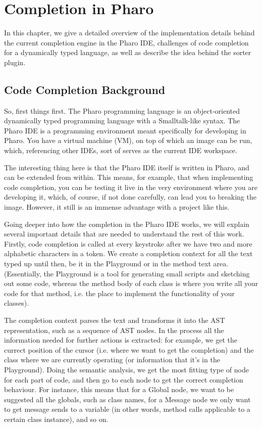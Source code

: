 \chapter{Completion in Pharo}
\label{chap:Completion in Pharo}

In this chapter, we give a detailed overview of the implementation details behind the current completion engine in the Pharo IDE, challenges of code completion for a dynamically typed language, as well as describe the idea behind the sorter plugin.

\section{Code Completion Background}
So, first things first. The Pharo programming language is an object-oriented dynamically typed programming language with a Smalltalk-like syntax. The Pharo IDE is a programming environment meant specifically for developing in Pharo. You have a virtual machine (VM), on top of which an image can be run, which, referencing other IDEs, sort of serves as the current IDE workspace.

The interesting thing here is that the Pharo IDE itself is written in Pharo, and can be extended from within. This means, for example, that when implementing code completion, you can be testing it live in the very environment where you are developing it, which, of course, if not done carefully, can lead you to breaking the image. However, it still is an immense advantage with a project like this.

Going deeper into how the completion in the Pharo IDE works, we will explain several important details that are needed to understand the rest of this work. Firstly, code completion is called at every keystroke after we have two and more alphabetic characters in a token. We create a completion context for all the text typed up until then, be it in the Playground or in the method text area. (Essentially, the Playground is a tool for generating small scripts and sketching out some code, whereas the method body of each class is where you write all your code for that method, i.e. the place to implement the functionality of your classes).

The completion context parses the text and transforms it into the AST representation, such as a sequence of AST nodes. In the process all the information needed for further actions is extracted: for example, we get the currect position of the cursor (i.e. where we want to get the completion) and the class where we are currently operating (or information that it's in the Playground). Doing the semantic analysis, we get the most fitting type of node for each part of code, and then go to each node to get the correct completion behaviour. For instance, this means that for a Global node, we want to be suggested all the globals, such as class names, for a Message node we only want to get message sends to a variable (in other words, method calls applicable to a certain class instance), and so on.

